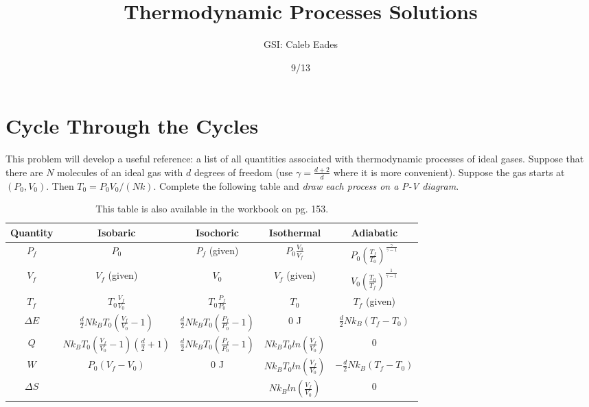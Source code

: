 \documentclass{article}
\begin{document}
\title{Thermodynamic Processes Solutions}
\author{GSI: Caleb Eades}
\date{9/13}
\maketitle

\section{Cycle Through the Cycles}

This problem will develop a useful reference: a list of all quantities associated with thermodynamic processes of ideal gases. Suppose that there are $N$ molecules of an ideal gas with $d$ degrees of freedom (use $\gamma = \frac{d+2}{d}$ where it is more convenient). Suppose the gas starts at $(P_0,V_0)$. Then $T_0 = P_0V_0/(Nk)$. Complete the following table and \textit{draw each process on a P-V diagram}.

\def\arraystretch{2.5}
\begin{table}[h]
	\begin{center}
	\caption{This table is also available in the workbook on pg. 153.}
	
	\begin{tabular}{| >{\Large}c|c|c|c|c|}
		\hline
		\normalsize{\textbf{Quantity}} & \textbf{Isobaric} & \textbf{Isochoric} & \textbf{Isothermal} & \textbf{Adiabatic} \\ \hline
		$P_f$             & $P_0$             & $P_f$ (given)          & $P_0\frac{V_0}{V_f}$& $P_0\left(\frac{T_f}{T_0}\right)^{\frac{\gamma}{\gamma-1}}$                   \\ \hline
		$V_f$             & $V_f$ (given)     & $V_0$                  & $V_f$ (given)       & $V_0\left(\frac{T_0}{T_f}\right)^{\frac{1}{\gamma-1}}$                   \\ \hline
		$T_f$             & $T_0\frac{V_f}{V_0}$& $T_0\frac{P_f}{P_0}$ & $T_0$               & $T_f$ (given)      \\ \hline
		$\Delta E$        & $\frac{d}{2}Nk_BT_0\left(\frac{V_f}{V_0}-1\right)$ & $\frac{d}{2}Nk_BT_0\left(\frac{P_f}{P_0}-1\right)$                       & $0$ J                 & $\frac{d}{2}Nk_B(T_f-T_0)$                   \\ \hline
		$Q$               & $Nk_BT_0\left(\frac{V_f}{V_0}-1\right)\left(\frac{d}{2}+1\right)$                  & $\frac{d}{2}Nk_BT_0\left(\frac{P_f}{P_0}-1\right)$                       & $Nk_BT_0ln\left(\frac{V_f}{V_0}\right)$                    & $0$                   \\ \hline
		$W$               & $P_0(V_f-V_0)$                  & $0$ J                      & $Nk_BT_0ln\left(\frac{V_f}{V_0}\right)$                    & $-\frac{d}{2}Nk_B(T_f-T_0)$                   \\ \hline
		$\Delta S$        &                   &                        & $Nk_Bln\left(\frac{V_f}{V_0}\right)$                    & $0$                    \\ \hline
	\end{tabular}
	\end{center}
\end{table}
\end{document}
